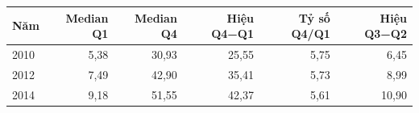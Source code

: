 \begin{tabular}{lrrrrr}
\toprule
Năm & Median Q1 & Median Q4 & Hiệu Q4−Q1 & Tỷ số Q4/Q1 & Hiệu Q3−Q2 \\
\midrule
2010 & 5,38 & 30,93 & 25,55 & 5,75 & 6,45 \\
2012 & 7,49 & 42,90 & 35,41 & 5,73 & 8,99 \\
2014 & 9,18 & 51,55 & 42,37 & 5,61 & 10,90 \\
\bottomrule
\end{tabular}
